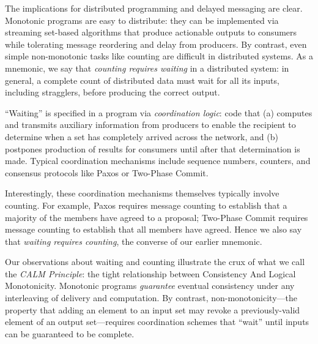 The implications for distributed programming and delayed messaging are clear. Monotonic programs are easy to distribute: they can be implemented via streaming set-based algorithms that produce actionable outputs to consumers while tolerating message reordering and delay from producers.  By contrast, even simple non-monotonic tasks like counting are difficult in distributed systems.  As a mnemonic, we say that \emph{counting requires waiting} in a distributed system: in general, a complete count of distributed data must wait for all its inputs, including stragglers, before producing the correct output.

``Waiting'' is specified in a program via \emph{coordination logic}: code that (a) computes and transmits auxiliary information from producers to enable the recipient to determine when a set has completely arrived across the network, and (b) postpones production of results for consumers until after that determination is made.  Typical coordination mechanisms include sequence numbers, counters, and consensus protocols like Paxos or Two-Phase Commit.

Interestingly, these coordination mechanisms themselves typically involve counting.  For example, Paxos requires message counting to establish that a majority of the members have agreed to a proposal; Two-Phase Commit requires message counting to establish  that all members have agreed.  Hence we also say that \emph{waiting requires counting}, the converse of our earlier mnemonic.  

Our observations about waiting and counting illustrate the crux of what we call the \emph{CALM Principle}: the tight relationship between Consistency And Logical Monotonicity.  Monotonic programs \emph{guarantee} eventual consistency under any interleaving of delivery and computation.  By contrast, non-monotonicity---the property that adding an element to an input set may revoke a previously-valid element of an output set---requires coordination schemes that ``wait'' until inputs can be guaranteed to be complete.  

